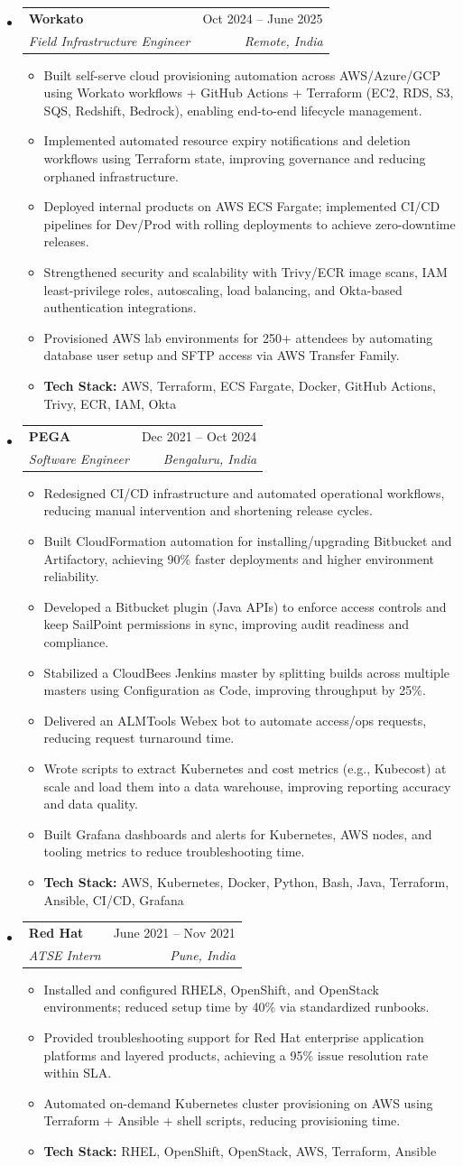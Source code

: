 \documentclass[letterpaper,10pt]{article}
\makeatletter
\newcommand{\resumeItem}[1]{
  \item \small{#1}
}
\newcommand{\resumeSubheading}[4]{
  \vspace{1pt}\item
    \begin{tabular*}{1.0\textwidth}[t]{l@{\extracolsep{\fill}}r}
      \textbf{#1} & #2 \\
      \textit{#3} & \textit{#4} \\
    \end{tabular*}\vspace{-2pt}
}
\newcommand{\resumeSubHeadingListStart}{\begin{itemize}[leftmargin=0.0in, label={}, topsep=2pt, itemsep=2pt]}
\newcommand{\resumeSubHeadingListEnd}{\end{itemize}}
\newcommand{\resumeItemListStart}{\begin{itemize}[topsep=2pt, itemsep=2pt]}
\newcommand{\resumeItemListEnd}{\end{itemize}\vspace{1pt}}
\makeatother
\begin{document}
\resumeSubHeadingListStart
\resumeSubheading
{Workato}{Oct 2024 -- June 2025}
{Field Infrastructure Engineer}{Remote, India}
\resumeItemListStart
\resumeItem{Built self-serve cloud provisioning automation across AWS/Azure/GCP using Workato workflows + GitHub Actions + Terraform (EC2, RDS, S3, SQS, Redshift, Bedrock), enabling end-to-end lifecycle management.}
\resumeItem{Implemented automated resource expiry notifications and deletion workflows using Terraform state, improving governance and reducing orphaned infrastructure.}
\resumeItem{Deployed internal products on AWS ECS Fargate; implemented CI/CD pipelines for Dev/Prod with rolling deployments to achieve zero-downtime releases.}
\resumeItem{Strengthened security and scalability with Trivy/ECR image scans, IAM least-privilege roles, autoscaling, load balancing, and Okta-based authentication integrations.}
\resumeItem{Provisioned AWS lab environments for 250+ attendees by automating database user setup and SFTP access via AWS Transfer Family.}
\resumeItem{\textbf{Tech Stack:} AWS, Terraform, ECS Fargate, Docker, GitHub Actions, Trivy, ECR, IAM, Okta}
\resumeItemListEnd
\resumeSubHeadingListEnd

\resumeSubHeadingListStart
\resumeSubheading
{PEGA}{Dec 2021 -- Oct 2024}
{Software Engineer}{Bengaluru, India}
\resumeItemListStart
\resumeItem{Redesigned CI/CD infrastructure and automated operational workflows, reducing manual intervention and shortening release cycles.}
\resumeItem{Built CloudFormation automation for installing/upgrading Bitbucket and Artifactory, achieving 90\% faster deployments and higher environment reliability.}
\resumeItem{Developed a Bitbucket plugin (Java APIs) to enforce access controls and keep SailPoint permissions in sync, improving audit readiness and compliance.}
\resumeItem{Stabilized a CloudBees Jenkins master by splitting builds across multiple masters using Configuration as Code, improving throughput by 25\%.}
\resumeItem{Delivered an ALMTools Webex bot to automate access/ops requests, reducing request turnaround time.}
\resumeItem{Wrote scripts to extract Kubernetes and cost metrics (e.g., Kubecost) at scale and load them into a data warehouse, improving reporting accuracy and data quality.}
\resumeItem{Built Grafana dashboards and alerts for Kubernetes, AWS nodes, and tooling metrics to reduce troubleshooting time.}
\resumeItem{\textbf{Tech Stack:} AWS, Kubernetes, Docker, Python, Bash, Java, Terraform, Ansible, CI/CD, Grafana}
\resumeItemListEnd
\resumeSubHeadingListEnd

\resumeSubHeadingListStart
\resumeSubheading
{Red Hat}{June 2021 -- Nov 2021}
{ATSE Intern}{Pune, India}
\resumeItemListStart
\resumeItem{Installed and configured RHEL8, OpenShift, and OpenStack environments; reduced setup time by 40\% via standardized runbooks.}
\resumeItem{Provided troubleshooting support for Red Hat enterprise application platforms and layered products, achieving a 95\% issue resolution rate within SLA.}
\resumeItem{Automated on-demand Kubernetes cluster provisioning on AWS using Terraform + Ansible + shell scripts, reducing provisioning time.}
\resumeItem{\textbf{Tech Stack:} RHEL, OpenShift, OpenStack, AWS, Terraform, Ansible}
\resumeItemListEnd
\resumeSubHeadingListEnd
\end{document}
